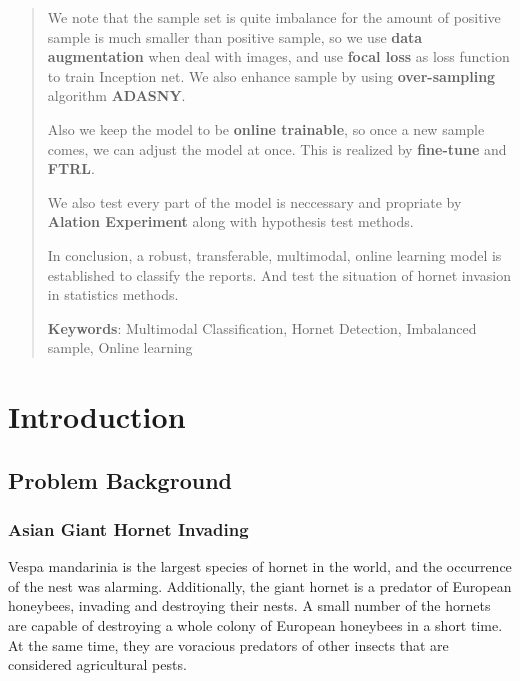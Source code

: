 \documentclass[12pt]{article}
\begin{document}
\begin{abstract}
We note that the sample set is quite imbalance for the amount of positive sample is much smaller than positive sample, so we use \textbf{data augmentation} when deal with images, and use \textbf{focal loss} as loss function to train Inception net. We also enhance sample by using \textbf{over-sampling} algorithm \textbf{ADASNY}.

Also we keep the model to be \textbf{online trainable}, so once a new sample comes, we can adjust the model at once. This is realized by \textbf{ fine-tune} and \textbf{FTRL}.


We also test every part of the model is neccessary and propriate by \textbf{Alation Experiment} along with hypothesis test methods.

In conclusion, a robust, transferable,  multimodal, online learning model is established to classify the reports. And test the situation of hornet invasion in statistics methods.


\textbf{Keywords}:  Multimodal Classification, Hornet Detection, Imbalanced sample, Online learning

\end{abstract}

\clearpage
\pagestyle{fancy}
\tableofcontents 
\newpage
\setcounter{page}{1}






\section{Introduction}
\subsection{Problem Background}
\subsubsection{Asian Giant Hornet Invading  }
Vespa mandarinia is the largest species of hornet in the world, and the occurrence of the nest was alarming. Additionally, the giant hornet is a predator of European honeybees, invading and destroying their nests. A small number of the hornets are capable of destroying a whole colony of European honeybees in a short time. At the same time, they are voracious predators of other insects that are considered agricultural pests.
\end{document}
